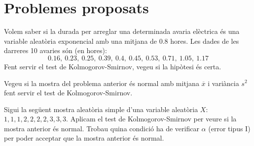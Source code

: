 \section{Problemes proposats}

\begin{prob}
{Volem saber si la durada per arreglar una determinada
avaria el\`ectrica \'es una variable aleat\`oria exponencial amb una mitjana de
0.8 hores. Les dades de les darreres 10 avaries s\'on (en hores):
$$0.16,\ 0.23,\ 0.25,\ 0.39,\ 0.4,\ 0.45,\ 0.53,\ 0.71,\ 1.05,\ 1.17$$
Fent servir el test de Kolmogorov-Smirnov, vegeu si la hip\`otesi \'es certa.}
\end{prob}

\begin{prob}
{Vegeu si la mostra del problema anterior \'es
normal amb mitjana $\overline x$ i vari\`ancia $s^2$ fent servir el test de
Kolmogorov-Smirnov.}
\end{prob}

\begin{prob}
{Sigui la seg\"uent mostra aleat\`oria simple d'una variable aleat\`oria
$X$:\hfill\break $1,1,1,2,2,2,2,3,3,3$. Aplicam el test de
Kolmogorov-Smirnov per veure si la mostra anterior \'es normal. Trobau quina
condici\'o ha de verificar $\alpha$ (error tipus I) per poder acceptar que la
mostra anterior \'es normal.
}
\end{prob}



